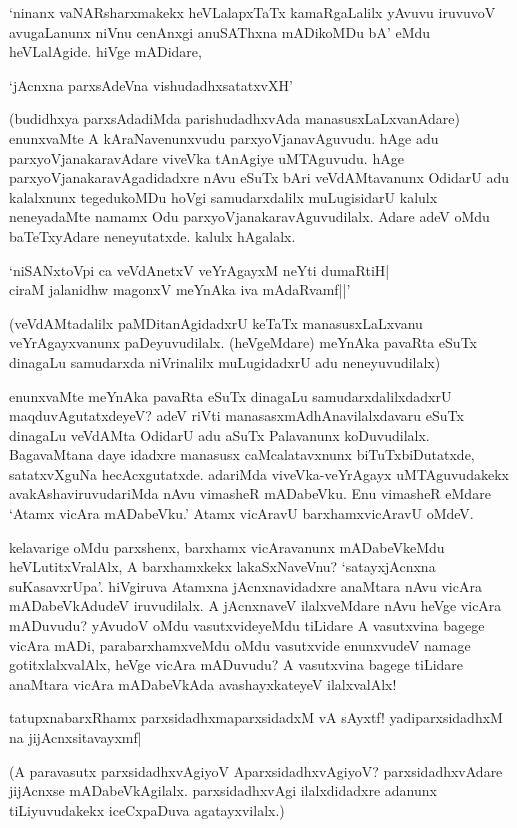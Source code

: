 `ninanx vaNARsharxmakekx heVLalapxTaTx kamaRgaLalilx yAvuvu iruvuvoV avugaLanunx niVnu cenAnxgi anuSAThxna mADikoMDu bA' eMdu heVLalAgide. hiVge mADidare,

\begin{shloka}
`jAcnxna parxsAdeVna vishudadhxsatatxvXH'
\end{shloka}

(budidhxya parxsAdadiMda parishudadhxvAda manasusxLaLxvanAdare) enunxvaMte A kAraNavenunxvudu parxyoVjanavAguvudu. hAge adu parxyoVjanakaravAdare viveVka tAnAgiye uMTAguvudu. hAge parxyoVjanakaravAgadidadxre nAvu eSuTx bAri veVdAMtavanunx OdidarU adu kalalxnunx tegedukoMDu hoVgi samudarxdalilx muLugisidarU kalulx neneyadaMte namamx Odu parxyoVjanakaravAguvudilalx. Adare adeV oMdu baTeTxyAdare neneyutatxde. kalulx hAgalalx.

\begin{shloka}
`niSANxtoV\s pi ca veVdAnetxV veYrAgayxM neYti dumaRtiH|\\
ciraM jalanidhw magonxV meYnAka iva mAdaRvamf||'
\end{shloka}

(veVdAMtadalilx paMDitanAgidadxrU keTaTx manasusxLaLxvanu veYrAgayxvanunx paDeyuvudilalx. (heVgeMdare) meYnAka pavaRta eSuTx dinagaLu samudarxda niVrinalilx muLugidadxrU adu neneyuvudilalx)

enunxvaMte meYnAka pavaRta eSuTx dinagaLu samudarxdalilxdadxrU maqduvAgutatxdeyeV? adeV riVti manasasxmAdhAnavilalxdavaru eSuTx dinagaLu veVdAMta OdidarU adu aSuTx Palavanunx koDuvudilalx. BagavaMtana daye idadxre manasusx caMcalatavxnunx biTuTxbiDutatxde, satatxvXguNa hecAcxgutatxde. adariMda viveVka-veYrAgayx uMTAguvudakekx avakAshaviruvudariMda nAvu vimasheR mADabeVku. Enu vimasheR eMdare `Atamx vicAra mADabeVku.' Atamx vicAravU barxhamxvicAravU oMdeV.

kelavarige oMdu parxshenx, barxhamx vicAravanunx mADabeVkeMdu heVLutitxVralAlx, A barxhamxkekx lakaSxNaveVnu? `satayxjAcnxna suKasavxrUpa'. hiVgiruva Atamxna jAcnxnavidadxre anaMtara nAvu vicAra mADabeVkAdudeV iruvudilalx. A jAcnxnaveV ilalxveMdare nAvu heVge vicAra mADuvudu? yAvudoV oMdu vasutxvideyeMdu tiLidare A vasutxvina bagege vicAra mADi, parabarxhamxveMdu oMdu vasutxvide enunxvudeV namage gotitxlalxvalAlx, heVge vicAra mADuvudu? A vasutxvina bagege tiLidare anaMtara vicAra mADabeVkAda avashayxkateyeV ilalxvalAlx!

tatupxnabarxRhamx parxsidadhxmaparxsidadxM vA sAyxtf! yadiparxsidadhxM na jijAcnxsitavayxmf|

(A paravasutx parxsidadhxvAgiyoV AparxsidadhxvAgiyoV? parxsidadhxvAdare jijAcnxse mADabeVkAgilalx. parxsidadhxvAgi ilalxdidadxre adanunx tiLiyuvudakekx iceCxpaDuva agatayxvilalx.)

